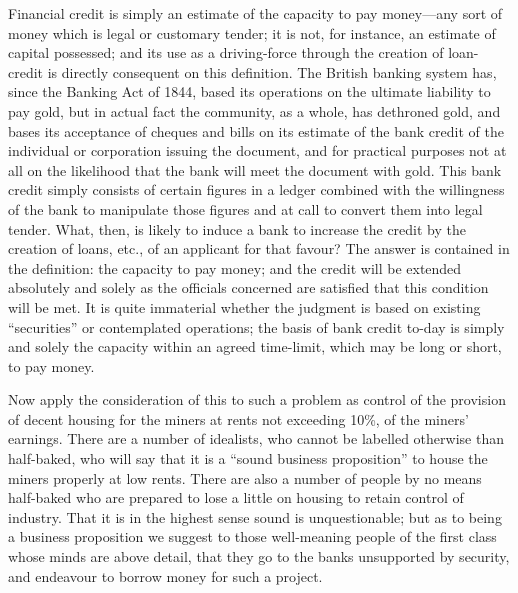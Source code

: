 \documentclass{book}
\begin{document}
Financial credit is simply an estimate of the capacity to pay money—any sort of money which is legal or customary tender; it is not, for instance, an estimate of capital possessed; and its use as a driving-force through the creation of loan-credit is directly consequent on this definition. The British banking system has, since the Banking Act of 1844, based its operations on the ultimate liability to pay gold, but in actual fact the community, as a whole, has dethroned gold, and bases its acceptance of cheques and bills on its estimate of the bank credit of the individual or corporation issuing the document, and for practical purposes not at all on the likelihood that the bank will meet the document with gold. This bank credit simply consists of certain figures in a ledger combined with the willingness of the bank to manipulate those figures and at call to convert them into legal tender. What, then, is likely to induce a bank to increase the credit by the creation of loans, etc., of an applicant for that favour? The answer is contained in the definition: the capacity to pay money; and the credit will be extended absolutely and solely as the officials concerned are satisfied that this condition will be met. It is quite immaterial whether the judgment is based on existing “securities” or contemplated operations; the basis of bank credit to-day is simply and solely the capacity within an agreed time-limit, which may be long or short, to pay money.

Now apply the consideration of this to such a problem as control of the provision of decent housing for the miners at rents not exceeding 10\%, of the miners’ earnings. There are a number of idealists, who cannot be labelled otherwise than half-baked, who will say that it is a “sound business proposition” to house the miners properly at low rents. There are also a number of people by no means half-baked who are prepared to lose a little on housing to retain control of industry. That it is in the highest sense sound is unquestionable; but as to being a business proposition we suggest to those well-meaning people of the first class whose minds are above detail, that they go to the banks unsupported by security, and endeavour to borrow money for such a project.
\end{document}
